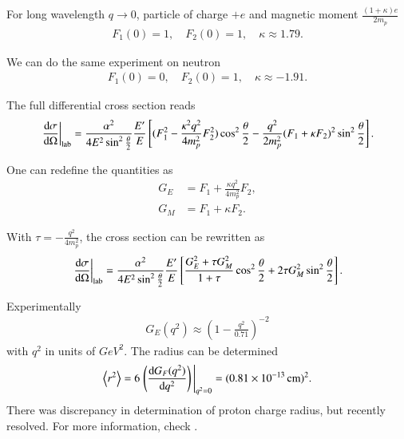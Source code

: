 For long wavelength $q \rightarrow 0$, particle of charge $+e$ and magnetic moment $\frac{(1+\kappa)e}{2 m_p}$
\begin{align*}
   F_1 (0) = 1, \quad F_2 (0) = 1, \quad \kappa \approx 1.79.
\end{align*}

We can do the same experiment on neutron
\begin{align*}
   F_1 (0) = 0, \quad F_2(0) = 1, \quad \kappa \approx -1.91.
\end{align*}

The full differential cross section reads
\begin{align}
   \eval{\dv{\sigma}{\Omega}}_{\text{lab}} = \frac{\alpha^2}{4 E^2 \sin^2 \frac{\theta}{2}} \frac{E'}{E} \left[ (F_1^2 - \frac{\kappa^2 q^2}{4m_p^2}F_2^2) \cos^2 \frac{\theta}{2} - \frac{q^2 }{2m_p^2} (F_1 + \kappa F_2)^2 \sin^2 \frac{\theta}{2} \right].
\end{align}

One can redefine the quantities as
\begin{align}
   G_E &= F_1 + \frac{\kappa q^2}{4 m_p^2} F_2, \\
   G_M &= F_1 + \kappa F_2.
\end{align}

With $ \tau = - \frac{q^2}{4m_p^2} $, the cross section can be rewritten as
\begin{align}
   \eval{\dv{\sigma}{\Omega}}_{\text{lab}} =  \frac{\alpha^2}{4 E^2 \sin^2 \frac{\theta}{2}} \frac{E'}{E} \left[ \frac{G_E^2 + \tau G_M^2 }{1 + \tau} \cos^2 \frac{\theta}{2} + 2 \tau G_M^2 \sin^2 \frac{\theta}{2} \right].
\end{align}

Experimentally
\begin{align*}
   G_E(q^2) \approx \left( 1 - \frac{q^2}{0.71} \right)^{-2}
\end{align*}
with $q^2$ in units of $GeV^2$. The radius can be determined 
\begin{align*}
   \expval{r^2} = 6 \eval{ \left( \dv{G_F(q^2)}{q^2} \right) }_{q^2 = 0} = ( \SI{0.81e-13}{\cm})^2.
\end{align*}
There was discrepancy in determination of proton charge radius, but recently resolved. For more information, check \cite{hammer2019proton}.

